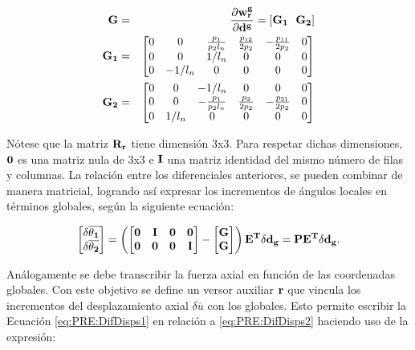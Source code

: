 \begin{eqnarray}\label{Eqn:PRE:Corrot:DefG}
		\bf{G}&=&\frac{\partial \bf{w_r^g}}{\partial \bf{d}^g}=[\bf{G}_1 ~~ \bf{G}_2]\\
		\bf{G}_1&=&\begin{bmatrix}
			0 &  0      &  \frac{p_1}{p_2 l_n} &  \frac{p_{12}}{2p_2} &-\frac{p_{11}}{2p_2}  &  0  \\
			0 &  0      &   1/l_n   &       0       &      0       &  0   \\
			0 & -1/l_n  &      0    &       0       &      0       &  0
		\end{bmatrix}\\
		\bf{G}_2&=&\begin{bmatrix}
			0  &  0    &   -1/l_n   &      0      &     0        &    0 \\
			0  &  0     &-\frac{p_1}{p_2 l_n}  & \frac{p_{2}}{2p_2} &-\frac{p_{21}}{2p_2} &    0 \\
			0  &  1/l_n &       0   &      0      &     0        &    0
		\end{bmatrix}
\end{eqnarray}

Nótese que la matriz $\bf{R}_r$ tiene dimensión 3x3. Para respetar dichas dimensiones, $\bf{0}$ es una matriz nula de 3x3 e $\bf{I}$ una matriz identidad del mismo número de filas y columnas. La relación entre los diferenciales anteriores, se pueden combinar de manera matricial, logrando así expresar los incrementos de ángulos locales en términos globales, según la siguiente ecuación:

\begin{equation}\label{Eqn:RPE:IncrementosAngulos}
	\begin{bmatrix}
		\bf{\delta\overline{\theta_1}}\\
		\bf{\delta\overline{\theta_2}}
	\end{bmatrix}=\left ( \begin{bmatrix}
		\bf{0} &\bf{I}  & \bf{0} &\bf{0} \\
		\bf{0}&\bf{0}  &\bf{0}  & \bf{I}
	\end{bmatrix}-\begin{bmatrix}
		\bf{G}\\
		\bf{G}
	\end{bmatrix} \right )\bf{E}^T \delta \bf{d_g}=\bf{P}\bf{E}^T \delta \bf{d_g}.
\end{equation}

Análogamente se debe transcribir la fuerza axial en función de las coordenadas globales. Con este objetivo se define un versor auxiliar  $ \bf{r}$ que vincula los incrementos del desplazamiento axial $\delta \overline{u}$ con los globales. Esto permite escribir la Ecuación \eqref{eq:PRE:DifDisps1} en relación a  \eqref{eq:PRE:DifDisps2} haciendo uso de la expresión:

